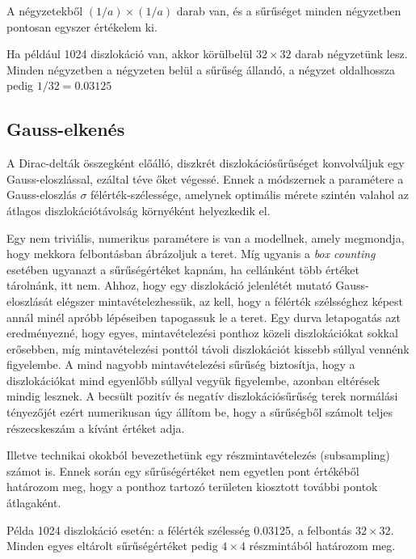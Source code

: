 \documentclass[10pt,a4paper]{scrartcl}
\begin{document}
A négyzetekből $\left( {1/a} \right) \times \left( {1/a} \right)$ darab van, és a sűrűséget minden négyzetben pontosan egyszer értékelem ki.

Ha például 1024 diszlokáció van, akkor körülbelül $32\times 32$ darab négyzetünk lesz. Minden négyzetben a négyzeten belül a sűrűség állandó, a négyzet oldalhossza pedig $1/32 = 0.03125$

\subsection{Gauss-elkenés}
A Dirac-delták összegként előálló, diszkrét diszlokációsűrűséget konvolváljuk egy Gauss-eloszlással, ezáltal téve őket végessé. Ennek a módszernek a paramétere a Gauss-eloszlás $\sigma$ félérték-szélessége, amelynek optimális mérete szintén valahol az átlagos diszlokációtávolság környéként helyezkedik el.

Egy nem triviális, numerikus paramétere is van a modellnek, amely megmondja, hogy mekkora felbontásban ábrázoljuk a teret. Míg ugyanis a \textit{box counting} esetében ugyanazt a sűrűségértéket kapnám, ha cellánként több értéket tárolnánk, itt nem. Ahhoz, hogy egy diszlokáció jelenlétét mutató Gauss-eloszlását elégszer mintavételezhessük, az kell, hogy a félérték szélsséghez képest annál minél apróbb lépéseiben tapogassuk le a teret. Egy durva letapogatás azt eredményezné, hogy egyes, mintavételezési ponthoz közeli diszlokációkat sokkal erősebben, míg mintavételezési ponttól távoli diszlokációt kissebb súllyal vennénk figyelembe. A mind nagyobb mintavételezési sűrűség biztosítja, hogy a diszlokációkat mind egyenlőbb súllyal vegyük figyelembe, azonban eltérések mindig lesznek. A becsült pozitív és negatív diszlokációsűrűség terek normálási tényezőjét ezért numerikusan úgy állítom be, hogy a sűrűségből számolt teljes részecskeszám a kívánt értéket adja.

Illetve technikai okokból bevezethetünk egy részmintavételezés (subsampling) számot is. Ennek során egy sűrűségértéket nem egyetlen pont értékéből határozom meg, hogy a ponthoz tartozó területen kiosztott további pontok átlagaként.

Példa 1024 diszlokáció esetén: a félérték szélesség 0.03125, a felbontás $32\times 32$. Minden egyes eltárolt sűrűségértéket pedig $4\times 4$ részmintából határozom meg.
\end{document}
